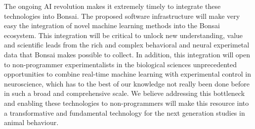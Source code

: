The ongoing AI revolution makes it extremely timely to integrate these
technologies into Bonsai. The proposed software infrastructure will make very
easy the integration of novel machine learning methods into the Bonsai
ecosystem. This integration will be critical to unlock new understanding, value
and scientific leads from the rich and complex behavioral and neural
experimetal data that Bonsai makes possible to collect. In addition, this
integration will open to non-programmer experimentalists in the biological
sciences unprecedented opportunities to combine real-time machine learning with
experimental control in neuroscience, which has to the best of our knowledge
not really been done before in such a broad and comprehensive scale. We believe
addressing this bottleneck and enabling these technologies to non-programmers
will make this resource into a transformative and fundamental technology for
the next generation studies in animal behaviour.

